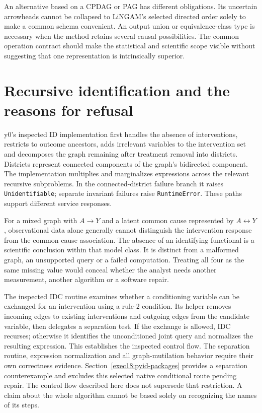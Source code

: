 An alternative based on a CPDAG or PAG has different obligations. Its uncertain
arrowheads cannot be collapsed to LiNGAM's selected directed order solely to
make a common schema convenient. An output union or equivalence-class type is
necessary when the method retains several causal possibilities. The common
operation contract should make the statistical and scientific scope visible
without suggesting that one representation is intrinsically superior.

\section{Recursive identification and the reasons for refusal}

y0's inspected ID implementation first handles the absence of interventions,
restricts to outcome ancestors, adds irrelevant variables to the intervention
set and decomposes the graph remaining after treatment removal into districts.
Districts represent connected components of the graph's bidirected component.
The implementation multiplies and marginalizes expressions across the relevant
recursive subproblems. In the connected-district failure branch it raises
\texttt{Unidentifiable}; separate invariant failures raise \texttt{RuntimeError}.
These paths support different service responses. \citep{v131_sw_y0}

For a mixed graph with $A\to Y$ and a latent common cause represented by
$A\leftrightarrow Y$, observational data alone generally cannot distinguish
the intervention response from the common-cause association. The absence of an
identifying functional is a scientific conclusion within that model class.
It is distinct from a malformed graph, an unsupported query or a failed
computation. Treating all four as the same missing value would conceal whether
the analyst needs another measurement, another algorithm or a software repair.

The inspected IDC routine examines whether a conditioning variable can be
exchanged for an intervention using a rule-2 condition. Its helper removes
incoming edges to existing interventions and outgoing edges from the candidate
variable, then delegates a separation test. If the exchange is allowed, IDC
recurses; otherwise it identifies the unconditioned joint query and normalizes
the resulting expression. This establishes the inspected control flow. The
separation routine, expression normalization and all graph-mutilation behavior
require their own correctness evidence. Section~\ref{exec18:pyid-packages}
provides a separation counterexample and excludes this selected native
conditional route pending repair. The control flow described here does not
supersede that restriction. A claim about the whole algorithm cannot be based
solely on recognizing the names of its steps.
\citep{v131_sw_y0}


